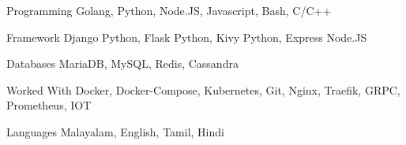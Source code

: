 


\begin{cvskills}


\cvskill
{Programming} %
{Golang, Python, Node.JS, Javascript, Bash, C/C++} %


\cvskill
{Framework} %
{Django Python, Flask Python, Kivy Python, Express Node.JS} %


\cvskill
{Databases} %
{MariaDB, MySQL, Redis, Cassandra} %


\cvskill
{Worked With} %
{Docker, Docker-Compose, Kubernetes, Git, Nginx, Traefik, GRPC, Prometheus, IOT} %


\cvskill
{Languages} %
{Malayalam, English, Tamil, Hindi} %


\end{cvskills}
